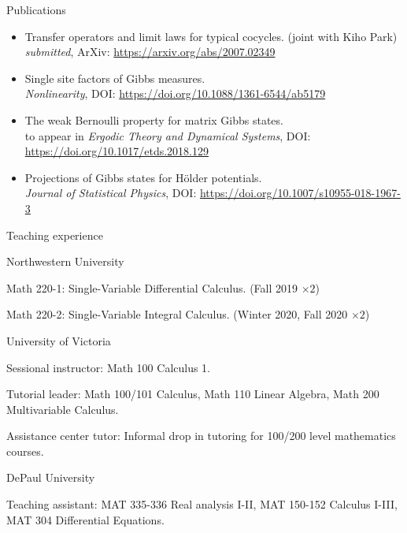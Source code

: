 \documentclass{resume} %
\begin{document}
\begin{rSection}{Publications}
	\begin{itemize}
		\item 
		Transfer operators and limit laws for typical cocycles. (joint with Kiho Park)\\
		\emph{submitted}, ArXiv: \href{https://arxiv.org/abs/2007.02349}{\small{https://arxiv.org/abs/2007.02349}}
		
		\item 
		Single site factors of Gibbs measures.\\
		\emph{Nonlinearity}, DOI: \href{https://doi.org/10.1088/1361-6544/ab5179}{\small{https://doi.org/10.1088/1361-6544/ab5179}}
		
		\item 
		The weak Bernoulli property for matrix Gibbs states.\\
		to appear in \emph{Ergodic Theory and Dynamical Systems}, DOI: \href{https://doi.org/10.1017/etds.2018.129}{\small{https://doi.org/10.1017/etds.2018.129}}
		
		\item 
		Projections of Gibbs states for H\"older potentials.\\
		\emph{Journal of Statistical Physics}, DOI: \href{https://doi.org/10.1007/s10955-018-1967-3}{\small{https://doi.org/10.1007/s10955-018-1967-3}}
	\end{itemize}
\end{rSection}

\begin{rSection}{Teaching experience}
	\begin{rSubsection}{Northwestern University}{}{}{}
		\item
		Math 220-1: Single-Variable Differential Calculus. (Fall 2019 $\times 2$)
		
		\item
		Math 220-2: Single-Variable Integral Calculus. (Winter 2020, Fall 2020 $\times 2$)
		
	\end{rSubsection}
	
	\begin{rSubsection}{University of Victoria}{}{}{}
		\item 
		Sessional instructor: Math 100 Calculus 1.
		
		\item 
		Tutorial leader: Math 100/101 Calculus, Math 110 Linear Algebra, Math 200 Multivariable Calculus.
		
		\item 
		Assistance center tutor: Informal drop in tutoring for 100/200 level mathematics courses.
	\end{rSubsection}
	
	\begin{rSubsection}{DePaul University}{}{}{}
		\item
		Teaching assistant: MAT 335-336 Real analysis I-II, MAT 150-152 Calculus I-III, MAT 304 Differential Equations.
	\end{rSubsection}
	
\end{rSection}
\end{document}
